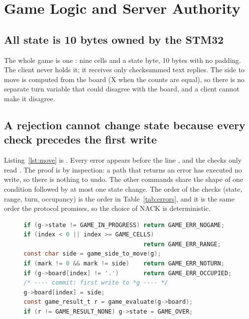 \section{Game Logic and Server Authority}
\label{sec:authority}

\subsection{All state is 10 bytes owned by the STM32}
The whole game is one : nine cells and a state byte, 10 bytes with no padding. The client never holds it; it receives
only checksummed text replies. The side to move is computed from the board (X when the counts are equal), so there is no separate turn variable that could
disagree with the board, and a client cannot make it disagree.

\subsection{A rejection cannot change state because every check precedes the first write}
Listing~\ref{lst:move} is . Every error  appears before the line , and the
checks only read . The proof is by inspection: a path that returns an error has executed no write, so there is nothing to undo.
The other commands share the shape of one condition followed by at most one state change. The order of the checks (state, range, turn,
occupancy) is the order in Table~\ref{tab:errors}, and it is the same order the protocol promises, so the choice of NACK is deterministic.

\begin{figure}[t]
\begin{lstlisting}[float=false,language=C, caption={Validate-then-commit (\texttt{game.c}, comments trimmed).}, label=lst:move]
if (g->state != GAME_IN_PROGRESS) return GAME_ERR_NOGAME;
if (index < 0 || index >= GAME_CELLS)
                                  return GAME_ERR_RANGE;
const char side = game_side_to_move(g);
if (mark != 0 && mark != side)    return GAME_ERR_NOTURN;
if (g->board[index] != '.')       return GAME_ERR_OCCUPIED;
/* ---- commit: first write to *g ---- */
g->board[index] = side;
const game_result_t r = game_evaluate(g->board);
if (r != GAME_RESULT_NONE) g->state = GAME_OVER;
\end{lstlisting}
\end{figure}

